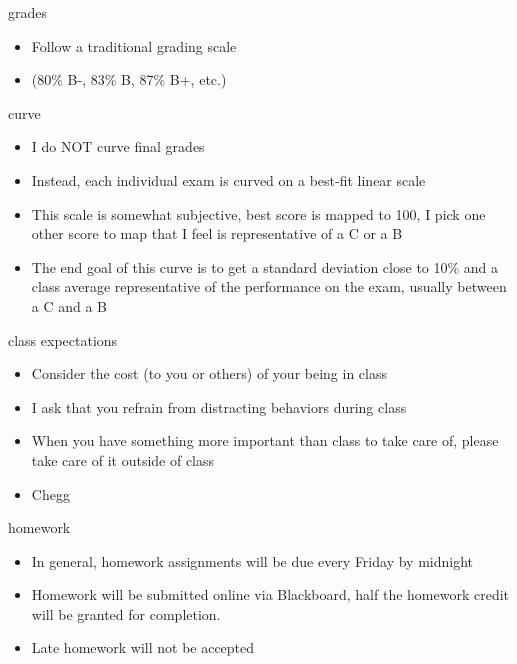 \documentclass[12pt,handout]{beamer}
\providecommand{\tightlist}{%
  \setlength{\itemsep}{0pt}\setlength{\parskip}{0pt}}
\providecommand{\tightlist}{%
\setlength{\itemsep}{0pt}\setlength{\parskip}{0pt}}
\begin{document}
\begin{frame}{grades}
\protect\hypertarget{grades-1}{}
\begin{itemize}
\tightlist
\item
  Follow a traditional grading scale
\item
  (80\% B-, 83\% B, 87\% B+, etc.)
\end{itemize}
\end{frame}

\begin{frame}{curve}
\protect\hypertarget{curve}{}
\begin{itemize}
\tightlist
\item
  I do NOT curve final grades
\item
  Instead, each individual exam is curved on a best-fit linear scale
\item
  This scale is somewhat subjective, best score is mapped to 100, I pick
  one other score to map that I feel is representative of a C or a B
\item
  The end goal of this curve is to get a standard deviation close to
  10\% and a class average representative of the performance on the
  exam, usually between a C and a B
\end{itemize}
\end{frame}

\begin{frame}{class expectations}
\protect\hypertarget{class-expectations}{}
\begin{itemize}
\tightlist
\item
  Consider the cost (to you or others) of your being in class
\item
  I ask that you refrain from distracting behaviors during class
\item
  When you have something more important than class to take care of,
  please take care of it outside of class
\item
  Chegg
\end{itemize}
\end{frame}

\begin{frame}{homework}
\protect\hypertarget{homework}{}
\begin{itemize}
\tightlist
\item
  In general, homework assignments will be due every Friday by midnight
\item
  Homework will be submitted online via Blackboard, half the homework
  credit will be granted for completion.
\item
  Late homework will not be accepted
\end{itemize}
\end{frame}
\end{document}
